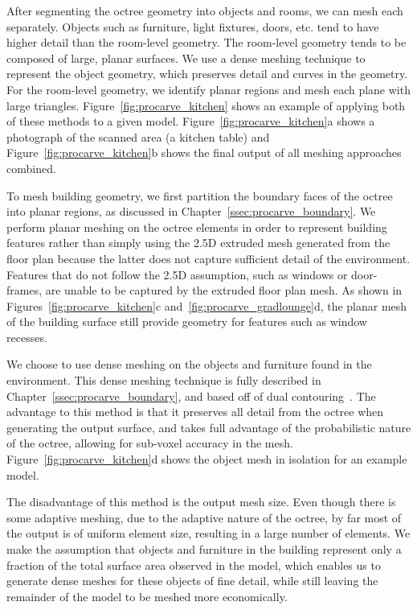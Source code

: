 \documentclass[12pt,onecolumn,oneside]{book}
\begin{document}
After segmenting the octree geometry into objects and rooms, we can mesh each separately.  Objects such as furniture, light fixtures, doors, etc. tend to have higher detail than the room-level geometry.  The room-level geometry tends to be composed of large, planar surfaces.  We use a dense meshing technique to represent the object geometry, which preserves detail and curves in the geometry.  For the room-level geometry, we identify planar regions and mesh each plane with large triangles.  Figure~\ref{fig:procarve_kitchen} shows an example of applying both of these methods to a given model.  Figure~\ref{fig:procarve_kitchen}a shows a photograph of the scanned area (a kitchen table) and Figure~\ref{fig:procarve_kitchen}b shows the final output of all meshing approaches combined.

To mesh building geometry, we first partition the boundary faces of the octree into planar regions, as discussed in Chapter~\ref{ssec:procarve_boundary}.   We perform planar meshing on the octree elements in order to represent building features rather than simply using the 2.5D extruded mesh generated from the floor plan because the latter does not capture sufficient detail of the environment.  Features that do not follow the 2.5D assumption, such as windows or door-frames, are unable to be captured by the extruded floor plan mesh.  As shown in Figures~\ref{fig:procarve_kitchen}c and~\ref{fig:procarve_gradlounge}d, the planar mesh of the building surface still provide geometry for features such as window recesses.

We choose to use dense meshing on the objects and furniture found in the environment.  This dense meshing technique is fully described in Chapter~\ref{ssec:procarve_boundary}, and based off of dual contouring~\cite{DualContouring}.  The advantage to this method is that it preserves all detail from the octree when generating the output surface, and takes full advantage of the probabilistic nature of the octree, allowing for sub-voxel accuracy in the mesh.  Figure~\ref{fig:procarve_kitchen}d shows the object mesh in isolation for an example model.  

The disadvantage of this method is the output mesh size.  Even though there is some adaptive meshing, due to the adaptive nature of the octree, by far most of the output is of uniform element size, resulting in a large number of elements.  We make the assumption that objects and furniture in the building represent only a fraction of the total surface area observed in the model, which enables us to generate dense meshes for these objects of fine detail, while still leaving the remainder of the model to be meshed more economically.
\end{document}
